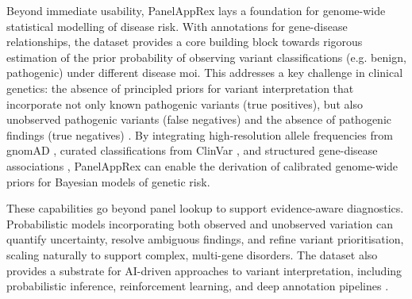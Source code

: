 Beyond immediate usability, PanelAppRex lays a foundation for genome-wide statistical modelling of disease risk. 
With annotations for gene-disease relationships, the dataset provides a core building block towards rigorous estimation of the prior probability of observing  variant classifications (e.g. benign, pathogenic) under different disease \ac{moi}.
This addresses a key challenge in clinical genetics: the absence of principled priors for variant interpretation that incorporate not only known pathogenic variants (true positives), but also unobserved pathogenic variants (false negatives) and the absence of pathogenic findings (true negatives) \cite{hannah_using_2024, zschocke_mendelian_2023}.
By integrating high-resolution allele frequencies from gnomAD \cite{karczewski2020mutational}, curated classifications from ClinVar \cite{landrum_clinvar_2018}, and structured gene-disease associations \cite{martin_panelapp_2019}, 
PanelAppRex can enable the derivation of calibrated genome-wide priors for Bayesian models of genetic risk.

These capabilities go beyond panel lookup to support evidence-aware diagnostics. 
Probabilistic models incorporating both observed and unobserved variation can quantify uncertainty, resolve ambiguous findings, and refine variant prioritisation, scaling naturally to support complex, multi-gene disorders. 
The dataset also provides a substrate for AI-driven approaches to variant interpretation, including probabilistic inference, reinforcement learning, and deep annotation pipelines
\cite{jumper_highly_2021, cheng_accurate_2023}.

